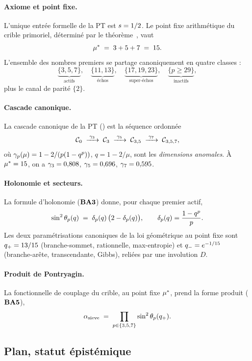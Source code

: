\paragraph{Axiome et point fixe.} L'unique entrée formelle de la PT est $s = 1/2$. Le point fixe arithmétique du crible primoriel, déterminé par le théorème~\Tfive, vaut
\[
\mu^{*} \;=\; 3 + 5 + 7 \;=\; 15.
\]
L'ensemble des nombres premiers se partage canoniquement en quatre classes :
\[
\underbrace{\{3, 5, 7\}}_{\text{actifs}}, \quad
\underbrace{\{11, 13\}}_{\text{échos}}, \quad
\underbrace{\{17, 19, 23\}}_{\text{super-échos}}, \quad
\underbrace{\{p \geq 29\}}_{\text{inactifs}},
\]
plus le canal de parité $\{2\}$.

\paragraph{Cascade canonique.} La cascade canonique de la PT (\cite[\S{}5]{PT_Article1_Foundations}) est la séquence ordonnée
\[
\mathcal C_0 \;\xrightarrow{\;\gamma_{3}\;}\; \mathcal C_3
\;\xrightarrow{\;\gamma_{5}\;}\; \mathcal C_{3,5}
\;\xrightarrow{\;\gamma_{7}\;}\; \mathcal C_{3,5,7},
\]
où $\gamma_{p}(\mu) = 1 - 2/(p(1 - q^{p}))$, $q = 1 - 2/\mu$, sont les \emph{dimensions anomales}. À $\mu^{*} = 15$, on a $\gamma_{3} = 0{,}808$, $\gamma_{5} = 0{,}696$, $\gamma_{7} = 0{,}595$.

\paragraph{Holonomie et secteurs.} La formule d'holonomie ($\textbf{BA3}$) donne, pour chaque premier actif,
\[
\sin^{2}\theta_{p}(q) \;=\; \delta_p(q)\,\bigl(2 - \delta_p(q)\bigr), \qquad \delta_p(q) = \dfrac{1 - q^{p}}{p}.
\]
Les deux paramétrisations canoniques de la loi géométrique au point fixe sont $q_{+} = 13/15$ (branche-sommet, rationnelle, max-entropie) et $q_{-} = e^{-1/15}$ (branche-arête, transcendante, Gibbs), reliées par une involution $D$.

\paragraph{Produit de Pontryagin.} La fonctionnelle de couplage du crible, au point fixe $\mu^{*}$, prend la forme produit ($\textbf{BA5}$),
\[
\alpha_{\rm sieve} \;=\; \prod_{p \in \{3,5,7\}} \sin^{2}\theta_{p}(q_{+}).
\]

\subsection{Plan, statut épistémique}
\label{sec:intro2:plan}

